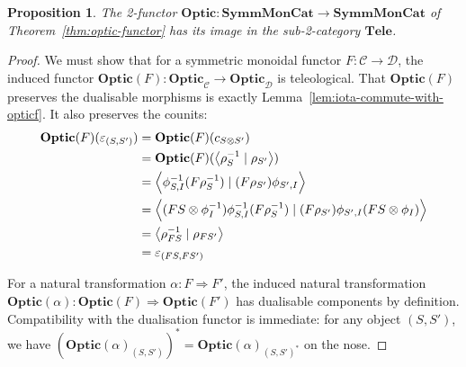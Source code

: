 \documentclass[11pt,letterpaper]{article}
\theoremstyle{plain}
\newtheorem{proposition}[theorem]{Proposition}
\theoremstyle{definition}
\newcommand{\C}{\mathscr{C}}
\newcommand{\D}{\mathscr{D}}
\newcommand{\SymmMonCat}{\mathbf{SymmMonCat}}
\newcommand{\Tele}{\mathbf{Tele}}
\newcommand{\Optic}{\mathbf{Optic}}
\newcommand{\rep}[2]{{\ensuremath \left\langle #1 \mid #2 \right\rangle}}
\newcommand{\hto}{\ensuremath{\,\mathaccent\shortmid\rightarrow\,}}
\begin{document}
\begin{proposition}
  The 2-functor $\Optic : \SymmMonCat \to \SymmMonCat$ of Theorem~\ref{thm:optic-functor} has its image in the sub-2-category $\Tele$.
\end{proposition}
\begin{proof}
  We must show that for a symmetric monoidal functor $F : \C \to \D$, the induced functor $\Optic(F) : \Optic_\C \to \Optic_\D$ is teleological. That $\Optic(F)$ preserves the dualisable morphisms is exactly Lemma~\ref{lem:iota-commute-with-opticf}. It also preserves the counits:
  \begin{align*}
    \Optic(F)(\varepsilon_{(S, S')})
    &= \Optic(F)(c_{S \otimes S'}) \\
    &= \Optic(F)(\rep{\rho_S^{-1}}{\rho_{S'}}) \\
    &= \rep{\phi^{-1}_{S,I} (F \rho_S^{-1})}{(F \rho_{S'}) \phi_{S',I}} \\
    &= \rep{(FS \otimes \phi_I^{-1}) \phi^{-1}_{S,I} (F \rho_S^{-1})}{(F \rho_{S'}) \phi_{S',I} (FS \otimes \phi_I)} \\
    &= \rep{\rho_{FS}^{-1}}{\rho_{FS'}} \\
    &= \varepsilon_{(FS, FS')}
  \end{align*}

For a natural transformation $\alpha : F \Rightarrow F'$, the induced natural transformation $\Optic(\alpha) : \Optic(F) \Rightarrow \Optic(F')$ has dualisable components by definition. Compatibility with the dualisation functor is immediate: for any object $(S, S')$, we have $(\Optic(\alpha)_{(S, S')})^* = \Optic(\alpha)_{(S, S')^*}$ on the nose.
\end{proof}

\end{document}

